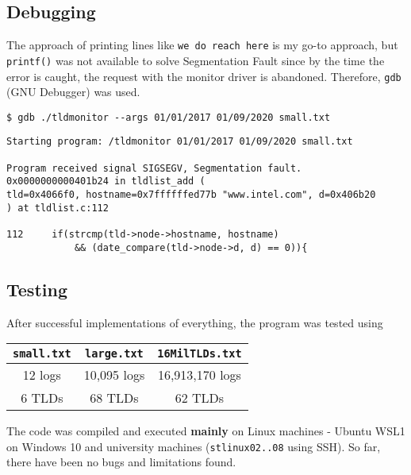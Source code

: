\documentclass{article}
\newcommand{\code}[1]{\texttt{#1}}
\begin{document}
\subsection{Debugging}
The approach of printing lines like \code{we do reach here} is my go-to approach, but \code{printf()} was not available to solve Segmentation Fault since by the time the error is caught, the request with the monitor driver is abandoned. Therefore, \code{gdb} (GNU Debugger) was used.

\begin{verbatim}
$ gdb ./tldmonitor --args 01/01/2017 01/09/2020 small.txt
\end{verbatim}

\vspace{-0.75cm}
\begin{verbatim}
Starting program: /tldmonitor 01/01/2017 01/09/2020 small.txt

Program received signal SIGSEGV, Segmentation fault.
0x0000000000401b24 in tldlist_add (
tld=0x4066f0, hostname=0x7ffffffed77b "www.intel.com", d=0x406b20
) at tldlist.c:112

112     if(strcmp(tld->node->hostname, hostname)
            && (date_compare(tld->node->d, d) == 0)){

\end{verbatim}

\subsection{Testing}
After successful implementations of everything, the program was tested using


\begin{table}[H]
\centering
\begin{tabular}{c|c|c}
\textbf{\code{small.txt}} & \textbf{\code{large.txt}}       & \textbf{\code{16MilTLDs.txt}}       \\ \hline
12 logs & 10,095 logs & 16,913,170 logs \\
6 TLDs  & 68 TLDs     & 62 TLDs                            
\end{tabular}
\end{table}

\noindent The code was compiled and executed \textbf{mainly} on Linux machines - Ubuntu WSL1 on Windows 10 and university machines (\code{stlinux02..08} using SSH). So far, there have been no bugs and limitations found.
\end{document}
